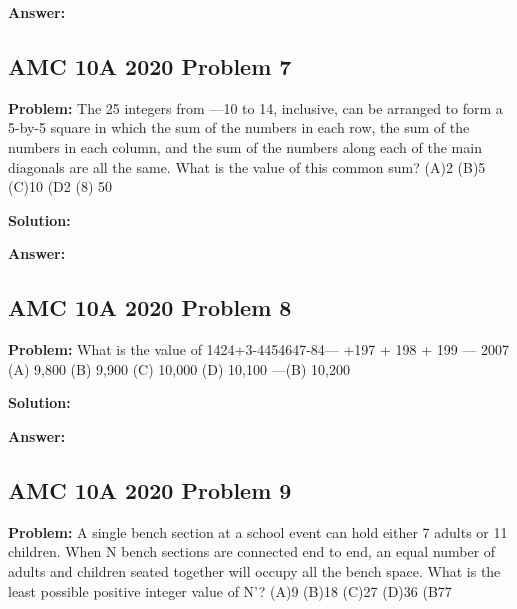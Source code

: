 \documentclass{article}
\newenvironment{problem}{\textbf{Problem: }}{\\}
\newenvironment{solution}{\textbf{Solution: }}{\\}
\newenvironment{answer}{\textbf{Answer: }}{\\}
\begin{document}
\begin{answer}
\end{answer}

\subsection{AMC 10A 2020 Problem 7}

\begin{problem}
The 25 integers from —10 to 14, inclusive, can be arranged to form a 5-by-5 square in which the sum of the numbers in each row, the sum of the numbers in each column, and the sum of the numbers along each of the main diagonals are all the same. What is the value of this common sum? (A)2 (B)5 (C)10 (D2 (8) 50
\end{problem}

\begin{solution}
\end{solution}

\begin{answer}
\end{answer}

\subsection{AMC 10A 2020 Problem 8}

\begin{problem}
What is the value of 1424+3-4454647-84--- +197 + 198 + 199 — 2007 (A) 9,800 (B) 9,900 (C) 10,000 (D) 10,100 —(B) 10,200
\end{problem}

\begin{solution}
\end{solution}

\begin{answer}
\end{answer}

\subsection{AMC 10A 2020 Problem 9}

\begin{problem}
A single bench section at a school event can hold either 7 adults or 11 children. When N bench sections are connected end to end, an equal number of adults and children seated together will occupy all the bench space. What is the least possible positive integer value of N'? (A)9 (B)18 (C)27 (D)36 (B77
\end{problem}
\end{document}
